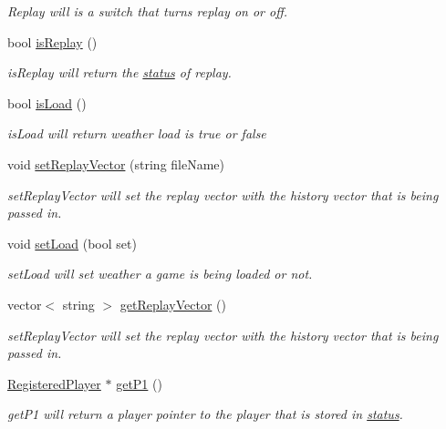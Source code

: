 \begin{DoxyCompactItemize}
\begin{DoxyCompactList}\small\item\em Replay will is a switch that turns replay on or off. \item\end{DoxyCompactList}\item 
bool \hyperlink{classstatus_a7054b21075d50ee360d86b89c8b5d007}{isReplay} ()
\begin{DoxyCompactList}\small\item\em isReplay will return the \hyperlink{classstatus}{status} of replay. \item\end{DoxyCompactList}\item 
bool \hyperlink{classstatus_a20a3ca42b44610b5f37f7ca415b3ebd0}{isLoad} ()
\begin{DoxyCompactList}\small\item\em isLoad will return weather load is true or false \item\end{DoxyCompactList}\item 
void \hyperlink{classstatus_a5d04df9098e1b998605b42262e3490a8}{setReplayVector} (string fileName)
\begin{DoxyCompactList}\small\item\em setReplayVector will set the replay vector with the history vector that is being passed in. \item\end{DoxyCompactList}\item 
void \hyperlink{classstatus_af323bc43c9ac2c262599a7ce605a93d2}{setLoad} (bool set)
\begin{DoxyCompactList}\small\item\em setLoad will set weather a game is being loaded or not. \item\end{DoxyCompactList}\item 
vector$<$ string $>$ \hyperlink{classstatus_a606237d9c1b4e0ff9f2da4103aebe4de}{getReplayVector} ()
\begin{DoxyCompactList}\small\item\em setReplayVector will set the replay vector with the history vector that is being passed in. \item\end{DoxyCompactList}\item 
\hyperlink{classRegisteredPlayer}{RegisteredPlayer} $\ast$ \hyperlink{classstatus_a9f4ec14653e8e058f86e9f666e75d237}{getP1} ()
\begin{DoxyCompactList}\small\item\em getP1 will return a player pointer to the player that is stored in \hyperlink{classstatus}{status}. \item\end{DoxyCompactList}\item 

\end{DoxyCompactItemize}
